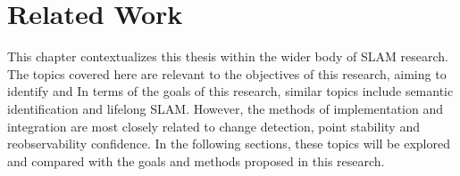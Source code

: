 \section{Related Work}
\label{sec:related_work}

This chapter contextualizes this thesis within the wider body of SLAM research. The topics covered here are relevant to the objectives of this research, aiming to identify and 
In terms of the goals of this research, similar topics include semantic identification and lifelong SLAM. However, the methods of implementation and integration are most closely related to change detection, point stability and reobservability confidence. In the following sections, these topics will be explored and compared with the goals and methods proposed in this research.

% 